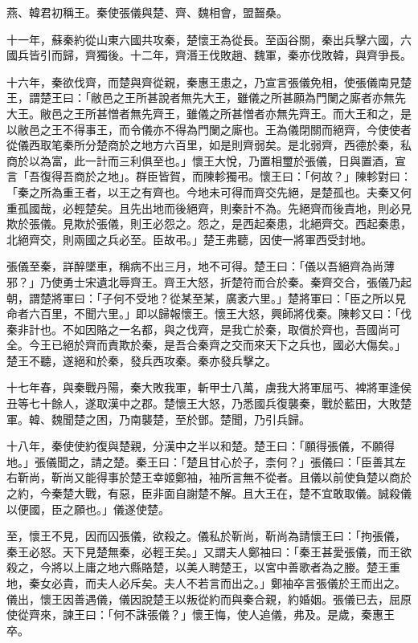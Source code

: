 \begin{pinyinscope}
燕、韓君初稱王。秦使張儀與楚、齊、魏相會，盟齧桑。

十一年，蘇秦約從山東六國共攻秦，楚懷王為從長。至函谷關，秦出兵擊六國，六國兵皆引而歸，齊獨後。十二年，齊湣王伐敗趙、魏軍，秦亦伐敗韓，與齊爭長。

十六年，秦欲伐齊，而楚與齊從親，秦惠王患之，乃宣言張儀免相，使張儀南見楚王，謂楚王曰：「敝邑之王所甚說者無先大王，雖儀之所甚願為門闌之廝者亦無先大王。敝邑之王所甚憎者無先齊王，雖儀之所甚憎者亦無先齊王。而大王和之，是以敝邑之王不得事王，而令儀亦不得為門闌之廝也。王為儀閉關而絕齊，今使使者從儀西取笔秦所分楚商於之地方六百里，如是則齊弱矣。是北弱齊，西德於秦，私商於以為富，此一計而三利俱至也。」懷王大悅，乃置相璽於張儀，日與置酒，宣言「吾復得吾商於之地」。群臣皆賀，而陳軫獨弔。懷王曰：「何故？」陳軫對曰：「秦之所為重王者，以王之有齊也。今地未可得而齊交先絕，是楚孤也。夫秦又何重孤國哉，必輕楚矣。且先出地而後絕齊，則秦計不為。先絕齊而後責地，則必見欺於張儀。見欺於張儀，則王必怨之。怨之，是西起秦患，北絕齊交。西起秦患，北絕齊交，則兩國之兵必至。臣故弔。」楚王弗聽，因使一將軍西受封地。

張儀至秦，詳醉墜車，稱病不出三月，地不可得。楚王曰：「儀以吾絕齊為尚薄邪？」乃使勇士宋遺北辱齊王。齊王大怒，折楚符而合於秦。秦齊交合，張儀乃起朝，謂楚將軍曰：「子何不受地？從某至某，廣袤六里。」楚將軍曰：「臣之所以見命者六百里，不聞六里。」即以歸報懷王。懷王大怒，興師將伐秦。陳軫又曰：「伐秦非計也。不如因賂之一名都，與之伐齊，是我亡於秦，取償於齊也，吾國尚可全。今王已絕於齊而責欺於秦，是吾合秦齊之交而來天下之兵也，國必大傷矣。」楚王不聽，遂絕和於秦，發兵西攻秦。秦亦發兵擊之。

十七年春，與秦戰丹陽，秦大敗我軍，斬甲士八萬，虜我大將軍屈丐、裨將軍逢侯丑等七十餘人，遂取漢中之郡。楚懷王大怒，乃悉國兵復襲秦，戰於藍田，大敗楚軍。韓、魏聞楚之困，乃南襲楚，至於鄧。楚聞，乃引兵歸。

十八年，秦使使約復與楚親，分漢中之半以和楚。楚王曰：「願得張儀，不願得地。」張儀聞之，請之楚。秦王曰：「楚且甘心於子，柰何？」張儀曰：「臣善其左右靳尚，靳尚又能得事於楚王幸姬鄭袖，袖所言無不從者。且儀以前使負楚以商於之約，今秦楚大戰，有惡，臣非面自謝楚不解。且大王在，楚不宜敢取儀。誠殺儀以便國，臣之願也。」儀遂使楚。

至，懷王不見，因而囚張儀，欲殺之。儀私於靳尚，靳尚為請懷王曰：「拘張儀，秦王必怒。天下見楚無秦，必輕王矣。」又謂夫人鄭袖曰：「秦王甚愛張儀，而王欲殺之，今將以上庸之地六縣賂楚，以美人聘楚王，以宮中善歌者為之媵。楚王重地，秦女必貴，而夫人必斥矣。夫人不若言而出之。」鄭袖卒言張儀於王而出之。儀出，懷王因善遇儀，儀因說楚王以叛從約而與秦合親，約婚姻。張儀已去，屈原使從齊來，諫王曰：「何不誅張儀？」懷王悔，使人追儀，弗及。是歲，秦惠王卒。


\end{pinyinscope}
